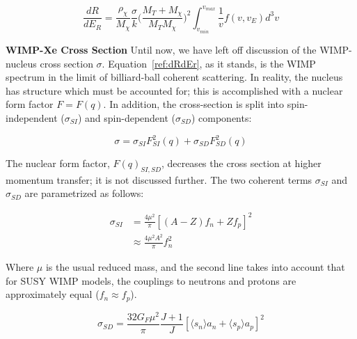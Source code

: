 \begin{equation}
\label{ref:dRdEr}
\frac{dR}{dE_{R}} =  \frac{\rho_{\chi}}{M_{\chi}} \frac{\sigma}{k} \Big( \frac{ M_{T} + M_{\chi}}{M_{T} M_{\chi}} \Big)^{2} \int_{v_{min}}^{v_{max}} \frac{1}{v} f(v,v_{E}) d^{3}v
\end{equation}

\textbf{WIMP-Xe Cross Section} Until now, we have left off discussion of the \ac{WIMP}-nucleus cross section $\sigma$. Equation~\ref{ref:dRdEr}, as it stands, is the \ac{WIMP} spectrum in the limit of billiard-ball coherent scattering. In reality, the nucleus has structure which must be accounted for; this is accomplished with a nuclear form factor $F = F(q)$. In addition, the cross-section is split into spin-independent ($\sigma_{SI}$) and spin-dependent ($\sigma_{SD}$) components:

\begin{equation}
\sigma = \sigma_{SI}F^{2}_{SI}(q) + \sigma_{SD}F^{2}_{SD}(q)
\end{equation}

The nuclear form factor, $F(q)_{SI, SD}$, decreases the cross section at higher momentum transfer; it is not discussed further. The two coherent terms $\sigma_{SI}$ and  $\sigma_{SD}$ are parametrized as follows:

\begin{equation}
\begin{split}
\sigma_{SI} &= \frac{4 \mu^{2} }{\pi} [ (A-Z) f_{n} + Zf_{p}]^{2} \\
 & \approx \frac{4 \mu^{2} A^{2}}{\pi} f_{n}^{2}
\end{split}
\end{equation}

Where $\mu$ is the usual reduced mass, and the second line takes into account that for \ac{SUSY} \ac{WIMP} models, the couplings to neutrons and protons are approximately equal ($f_{n} \approx f_{p}$).

\begin{equation}
\sigma_{SD} = \frac{32 G_{F} \mu^{2}}{\pi} \frac{J+1}{J} [\langle s_{n} \rangle a_{n} + \langle s_{p} \rangle a_{p}] ^{2}
\end{equation}

